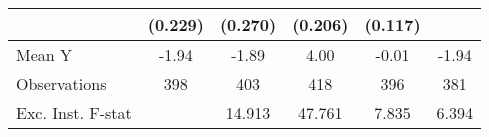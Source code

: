 {\begin{tabular}{l*{5}{c}}
            &     (0.229)         &     (0.270)         &     (0.206)         &     (0.117)         &                     \\
\midrule
Mean Y      &       -1.94         &       -1.89         &        4.00         &       -0.01         &       -1.94         \\
Observations&         398         &         403         &         418         &         396         &         381         \\
Exc. Inst. F-stat&                     &      14.913         &      47.761         &       7.835         &       6.394         \\
\bottomrule
\end{tabular}
}
